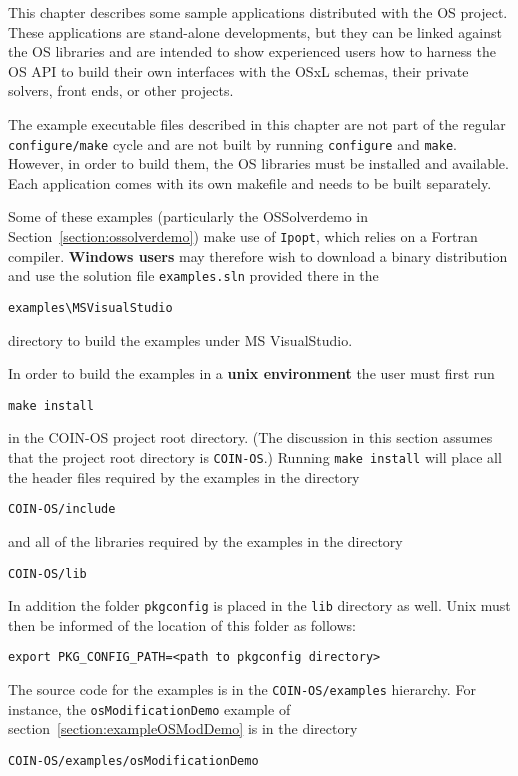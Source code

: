 \label{section:examples}

This chapter describes some sample applications distributed with the OS project. These applications 
are stand-alone developments, but they can be linked against the OS libraries and are intended to show
experienced users how to harness the OS API to build their own interfaces with the OSxL schemas, their private solvers, front ends, or other projects.

\ifdevelop
The example executable files described in this chapter are not part of the regular {\tt configure\rm/\tt make} cycle and are not built by running {\tt configure} and {\tt make}. However, in order to build them, the OS libraries must be installed and available. Each application comes with its own makefile  
and needs to be built separately.

\label{section:buildSamples}

Some of these examples (particularly the OSSolverdemo in Section~\ref{section:ossolverdemo}) 
make use of {\tt Ipopt}, which relies on a Fortran compiler.
{\bf Windows users} may therefore wish to download a binary distribution and use the solution file {\tt examples.sln} provided there in the 
\begin{verbatim}
examples\MSVisualStudio
\end{verbatim}
directory to build the examples under MS VisualStudio.

\medskip

In order to build the examples in a {\bf unix environment} the user must first run
%
\begin{verbatim}
make install
\end{verbatim}
in the COIN-OS project root directory. (The discussion in this section assumes that the project root directory is
{\tt COIN-OS}.)  Running {\tt make install}  will  place all the header files required by the examples in the directory
\begin{verbatim}
COIN-OS/include
\end{verbatim}
and all of the libraries required by the examples in the directory
\begin{verbatim}
COIN-OS/lib
\end{verbatim}
In addition the folder {\tt pkgconfig} is placed in the {\tt lib} directory as well. Unix must then be informed of the location of this folder as follows:
\begin{verbatim}
export PKG_CONFIG_PATH=<path to pkgconfig directory>
\end{verbatim}
The source code for the examples is in the {\tt COIN-OS/examples} hierarchy.  For instance, the {\tt osModificationDemo}
example of section~\ref{section:exampleOSModDemo} is in the directory
\begin{verbatim}
COIN-OS/examples/osModificationDemo
\end{verbatim}

